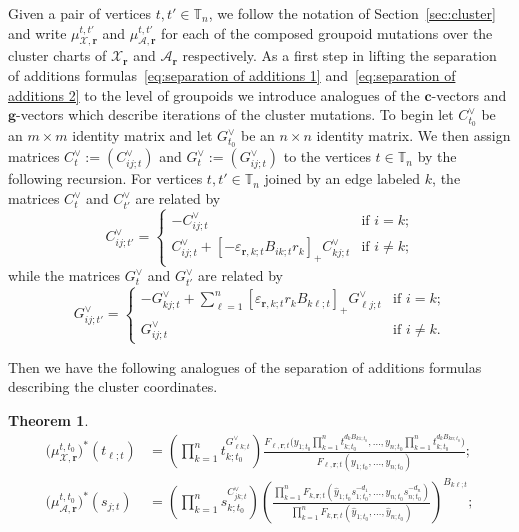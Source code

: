 \documentclass{amsart}
\newtheorem{theorem}{Theorem}[section]
\numberwithin{equation}{section}
\newcommand{\bfc}{\mathbf{c}}
\newcommand{\bfg}{\mathbf{g}}
\newcommand{\bfr}{{\boldsymbol{r}}}
\newcommand{\cA}{\mathcal{A}}
\newcommand{\cX}{\mathcal{X}}
\newcommand{\TT}{\mathbb{T}}
\begin{document}
Given a pair of vertices $t,t'\in\TT_n$, we follow the notation of Section~\ref{sec:cluster} and write $\mu_{\cX,\bfr}^{t,t'}$ and $\mu_{\cA,\bfr}^{t,t'}$ for each of the composed groupoid mutations over the cluster charts of $\cX_\bfr$ and $\cA_\bfr$ respectively.
As a first step in lifting the separation of additions formulas~\eqref{eq:separation of additions 1} and~\eqref{eq:separation of additions 2} to the level of groupoids we introduce analogues of the $\bfc$-vectors and $\bfg$-vectors which describe iterations of the cluster mutations.
To begin let $C^\vee_{t_0}$ be an $m\times m$ identity matrix and let $G^\vee_{t_0}$ be an $n\times n$ identity matrix.
We then assign matrices $C^\vee_t:=(C^\vee_{ij;t})$ and $G^\vee_t:=(G^\vee_{ij;t})$ to the vertices $t\in\TT_n$ by the following recursion.
For vertices $t,t'\in\TT_n$ joined by an edge labeled $k$, the matrices $C^\vee_t$ and $C^\vee_{t'}$ are related by
\begin{equation}
  \label{eq:dual c-matrix mutation}
  C^\vee_{ij;t'}=
  \begin{cases}
    -C^\vee_{ij;t} & \text{if $i=k$;}\\
    C^\vee_{ij;t}+[-\varepsilon_{\bfr,k;t} B_{ik;t} r_k]_+ C^\vee_{kj;t} & \text{if $i\ne k$;}
  \end{cases}
\end{equation}
while the matrices $G^\vee_t$ and $G^\vee_{t'}$ are related by
\begin{equation}
  \label{eq:dual g-matrix mutation}
  G^\vee_{ij;t'}=
  \begin{cases}
    -G^\vee_{kj;t}+\sum\limits_{\ell=1}^n [\varepsilon_{\bfr,k;t} r_k B_{k\ell;t}]_+ G^\vee_{\ell j;t} & \text{if $i=k$;}\\
    G^\vee_{ij;t} & \text{if $i\ne k$.}
  \end{cases}
\end{equation}

Then we have the following analogues of the separation of additions formulas describing the cluster coordinates.
\begin{theorem}
  \begin{align}
    \label{eq:groupoid separation of additions 1}
    \big(\mu_{\cX,\bfr}^{t,t_0}\big)^*(t_{\ell;t})&=\left(\prod_{k=1}^n t_{k;t_0}^{G^\vee_{\ell k;t}}\right) \frac{F_{\ell,\bfr;t}\big(y_{1;t_0}\prod_{k=1}^n t_{k;t_0}^{d_k B_{k1;t_0}},\ldots,y_{n;t_0}\prod_{k=1}^n t_{k;t_0}^{d_k B_{kn;t_0}}\big)}{F_{\ell,\bfr;t}(y_{1;t_0},\ldots,y_{n;t_0})};\\
    \label{eq:groupoid separation of additions 2}
    \big(\mu_{\cA,\bfr}^{t,t_0}\big)^*(s_{j;t})&=\left(\prod_{k=1}^n s_{k;t_0}^{C^\vee_{jk;t}}\right) \left(\frac{\prod_{k=1}^n F_{k,\bfr;t}(\hat y_{1;t_0} s_{1;t_0}^{-d_1},\ldots,\hat y_{n;t_0} s_{n;t_0}^{-d_n})}{\prod_{k=1}^n F_{k,\bfr;t}(\hat y_{1;t_0},\ldots,\hat y_{n;t_0})}\right)^{B_{k \ell;t}};
  \end{align}
\end{theorem}
\end{document}
